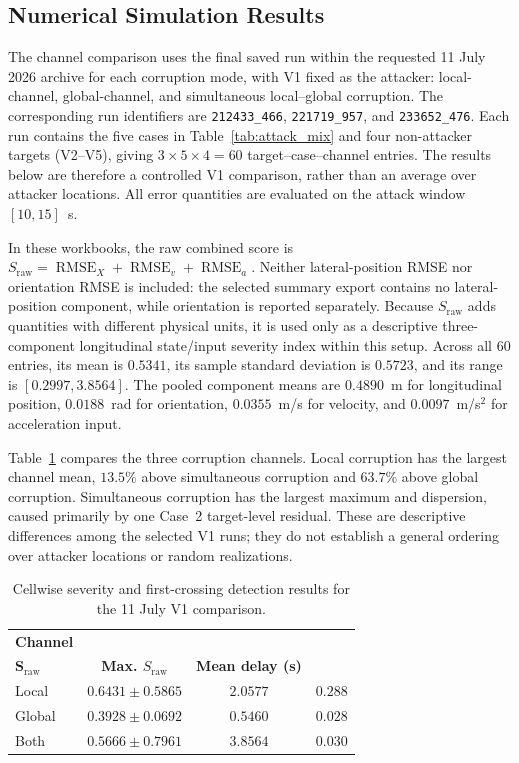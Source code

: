 \subsection{Numerical Simulation Results}

The channel comparison uses the final saved run within the requested 11 July 2026 archive for each corruption mode, with V1 fixed as the attacker: local-channel, global-channel, and simultaneous local--global corruption. The corresponding run identifiers are \texttt{212433\_466}, \texttt{221719\_957}, and \texttt{233652\_476}. Each run contains the five cases in Table~\ref{tab:attack_mix} and four non-attacker targets (V2--V5), giving $3\times5\times4=60$ target--case--channel entries. The results below are therefore a controlled V1 comparison, rather than an average over attacker locations. All error quantities are evaluated on the attack window $[10,15]$~s.

In these workbooks, the raw combined score is
$S_{\mathrm{raw}}=\operatorname{RMSE}_{X}+\operatorname{RMSE}_{v}+\operatorname{RMSE}_{a}$. Neither lateral-position RMSE nor orientation RMSE is included: the selected summary export contains no lateral-position component, while orientation is reported separately. Because $S_{\mathrm{raw}}$ adds quantities with different physical units, it is used only as a descriptive three-component longitudinal state/input severity index within this setup. Across all 60 entries, its mean is $0.5341$, its sample standard deviation is $0.5723$, and its range is $[0.2997,3.8564]$. The pooled component means are $0.4890$~m for longitudinal position, $0.0188$~rad for orientation, $0.0355$~m/s for velocity, and $0.0097$~m/s$^2$ for acceleration input.

Table~\ref{tab:attack_mode_rmse_summary} compares the three corruption channels. Local corruption has the largest channel mean, $13.5\%$ above simultaneous corruption and $63.7\%$ above global corruption. Simultaneous corruption has the largest maximum and dispersion, caused primarily by one Case~2 target-level residual. These are descriptive differences among the selected V1 runs; they do not establish a general ordering over attacker locations or random realizations.

\begin{table}[!t]
\centering
\caption{Cellwise severity and first-crossing detection results for the 11 July V1 comparison.}
\label{tab:attack_mode_rmse_summary}
\scriptsize
\begin{tabular}{lccc}
\toprule
\textbf{Channel} & \shortstack{\textbf{Cellwise mean $\pm$ SD}\\$\boldsymbol{S}_{\mathrm{raw}}$} & \textbf{Max. $S_{\mathrm{raw}}$} & \textbf{Mean delay (s)} \\
\midrule
Local  & $0.6431\pm0.5865$ & $2.0577$ & $0.288$ \\
Global & $0.3928\pm0.0692$ & $0.5460$ & $0.028$ \\
Both   & $0.5666\pm0.7961$ & $3.8564$ & $0.030$ \\
\bottomrule
\end{tabular}
\end{table}

